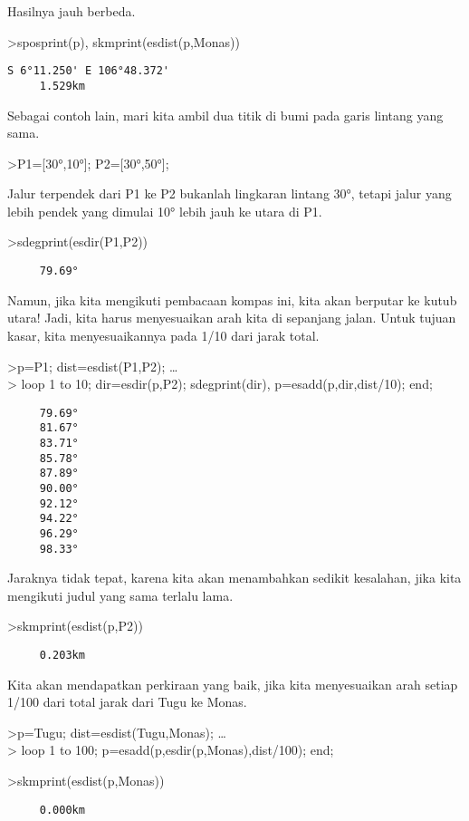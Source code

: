 \documentclass[
]{book}
\begin{document}
Hasilnya jauh berbeda.

\textgreater sposprint(p), skmprint(esdist(p,Monas))

\begin{verbatim}
S 6°11.250' E 106°48.372'
     1.529km
\end{verbatim}

Sebagai contoh lain, mari kita ambil dua titik di bumi pada garis lintang yang sama.

\textgreater P1={[}30°,10°{]}; P2={[}30°,50°{]};

Jalur terpendek dari P1 ke P2 bukanlah lingkaran lintang 30°, tetapi jalur yang lebih pendek yang dimulai 10° lebih jauh ke utara di P1.

\textgreater sdegprint(esdir(P1,P2))

\begin{verbatim}
     79.69°
\end{verbatim}

Namun, jika kita mengikuti pembacaan kompas ini, kita akan berputar ke kutub utara! Jadi, kita harus menyesuaikan arah kita di sepanjang jalan. Untuk tujuan kasar, kita menyesuaikannya pada 1/10 dari jarak total.

\textgreater p=P1; dist=esdist(P1,P2); \ldots{}\\
\textgreater{} loop 1 to 10; dir=esdir(p,P2); sdegprint(dir), p=esadd(p,dir,dist/10); end;

\begin{verbatim}
     79.69°
     81.67°
     83.71°
     85.78°
     87.89°
     90.00°
     92.12°
     94.22°
     96.29°
     98.33°
\end{verbatim}

Jaraknya tidak tepat, karena kita akan menambahkan sedikit kesalahan, jika kita mengikuti judul yang sama terlalu lama.

\textgreater skmprint(esdist(p,P2))

\begin{verbatim}
     0.203km
\end{verbatim}

Kita akan mendapatkan perkiraan yang baik, jika kita menyesuaikan arah setiap 1/100 dari total jarak dari Tugu ke Monas.

\textgreater p=Tugu; dist=esdist(Tugu,Monas); \ldots{}\\
\textgreater{} loop 1 to 100; p=esadd(p,esdir(p,Monas),dist/100); end;

\textgreater skmprint(esdist(p,Monas))

\begin{verbatim}
     0.000km
\end{verbatim}
\end{document}
